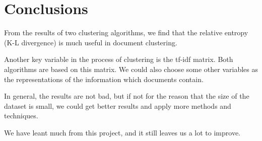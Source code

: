 \documentclass[a4paper, 12pt]{article}
\begin{document}
\section{Conclusions}
From the results of two clustering algorithms, we find that the relative entropy (K-L divergence) is much useful in document clustering.

Another key variable in the process of clustering is the tf-idf matrix. Both algorithms are based on this matrix. We could also choose some other variables as the representations of the information which documents contain.

In general, the results are not bad, but if not for the reason that the size of the dataset is small, we could get better results and apply more methods and techniques.

We have leant much from this project, and it still leaves us a lot to improve.
\end{document}
